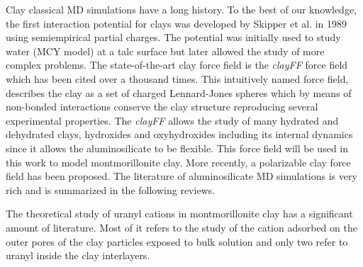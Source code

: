 Clay classical MD simulations have a long history. To the best of our knowledge, 
the first interaction potential for clays was developed by Skipper et al. in 
1989 using semiempirical partial charges.\cite{skipper1989computer} The potential was initially 
used to study water (MCY model\cite{MCY}) at a talc surface but later allowed the study of more 
complex 
problems\cite{JACS_Refson_2000,JChemPhys_Skipper_1991}. The state-of-the-art clay force field is 
the \textit{clayFF} force field which has been cited over a thousand 
times.\cite{clayFF_JPhysChemB_Cygan_2014} This intuitively named force field, describes the 
clay as a set of charged Lennard-Jones spheres which by means of non-bonded interactions conserve 
the clay structure reproducing several experimental properties. The \textit{clayFF} allows the 
study of many hydrated and dehydrated clays, hydroxides and oxyhydroxides including its internal 
dynamics since it allows the aluminosilicate to be flexible. This force field will be used in this 
work to model montmorillonite clay. More recently, a polarizable clay force field has been 
proposed\cite{tesson2016classical}. The literature of aluminosilicate MD
simulations is very 
rich and is summarized in the following 
reviews.\cite{JMatChem_Cygan_2009,MolSimClayMin_HandbookofClayScience_Cygan_2013_v2}

The theoretical study of uranyl cations in montmorillonite clay has a significant amount of 
literature. Most of it refers to the study of the cation adsorbed on the outer pores of the clay 
particles exposed to 
bulk solution\cite{PhysChemChemPhys_Greathouse_2005,EnviSciTech_Greathouse_2006,JHazMat_Yang_2013,
JHazMat_Liu_2013,MolSim_Cygan_2014,
InorChemFronteirs_Zhang_2015} and only two refer to uranyl inside the clay interlayers. 
\cite{ClayMinSoc_Zaidan_2003,ClayMinSoc_Greathouse_2005} 

